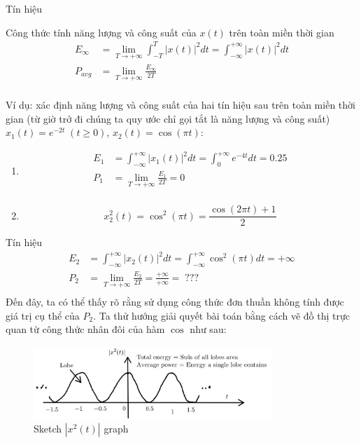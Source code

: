 \documentclass[8pt]{beamer}
\begin{document}
\begin{frame}{Tín hiệu}
	\begin{block}{Công thức tính năng lượng và công suất của $x(t)$ trên toàn miền thời gian}
	\begin{equation*}
		\begin{split}
			E_{\infty}&=\lim_{T\to +\infty}\int_{-T}^{T}|x(t)|^2dt=\int_{-\infty}^{+\infty}|x(t)|^2 dt \\
			P_{avg}&=\lim_{T\to +\infty}\frac{E_{\infty}}{2T} \\
		\end{split}
	\end{equation*}
	\end{block}
	Ví dụ: xác định năng lượng và công suất của hai tín hiệu sau trên toàn miền thời gian (từ giờ trở đi chúng ta quy ước chỉ gọi tắt là năng lượng và công suất) $x_{1}(t)=e^{-2t} \; (t\geq 0)$, $x_{2}(t)=\cos{(\pi t)}$:
\begin{enumerate}
	\item 
	\begin{equation*}
	\begin{split}
		E_{1}&=\int_{-\infty}^{+\infty}|x_{1}(t)|^2dt=\int_{0}^{+\infty}e^{-4t}dt=0.25 \\
		P_{1}&=\lim_{T\to +\infty}\frac{E_{1}}{2T}=0 \\
	\end{split}
\end{equation*}
\item $$x_{2}^2(t)=\cos^2{(\pi t)}=\frac{\cos(2\pi t)+1}{2}$$
\end{enumerate}
\end{frame}
\begin{frame}{Tín hiệu}
\begin{equation*}
\begin{split}
	E_{2}&=\int_{-\infty}^{+\infty}|x_{2}(t)|^2dt=\int_{-\infty}^{+\infty}\cos^2{(\pi t)}dt=+\infty \\
	P_{2}&=\lim_{T\to +\infty}\frac{E_{2}}{2T}=\frac{+\infty}{+\infty}= \; ??? \\
\end{split}
\end{equation*}
Đến đây, ta có thể thấy rõ rằng sử dụng công thức đơn thuần không tính được giá trị cụ thể của $P_{2}$. Ta thử hướng giải quyết bài toán bằng cách vẽ đồ thị trực quan từ công thức nhân đôi của hàm $\cos{}$ như sau:
\begin{figure}[h]
			\includegraphics[width=0.8\textwidth]{lobe.jpg}
		\caption{Sketch $|x^2(t)|$ graph}			\label{fig:re4}
		\end{figure}

\end{frame}
\end{document}
